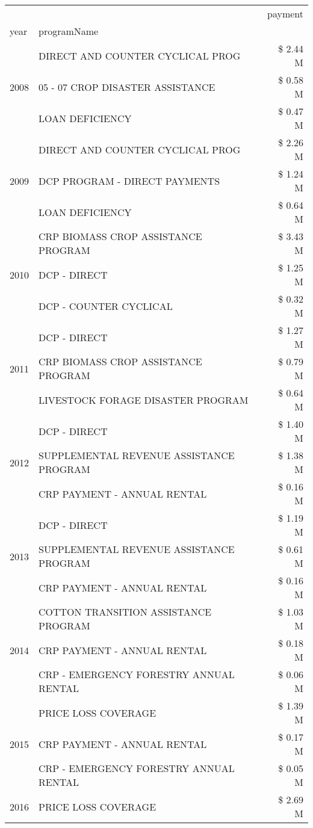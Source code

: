 \begin{tabular}{llr}
\toprule
 &  & payment \\
year & programName &  \\
\midrule
\multirow[t]{3}{*}{2008} & DIRECT AND COUNTER CYCLICAL PROG & \$ 2.44 M \\
 & 05 - 07 CROP DISASTER ASSISTANCE & \$ 0.58 M \\
 & LOAN DEFICIENCY & \$ 0.47 M \\
\cline{1-3}
\multirow[t]{3}{*}{2009} & DIRECT AND COUNTER CYCLICAL PROG & \$ 2.26 M \\
 & DCP PROGRAM - DIRECT PAYMENTS & \$ 1.24 M \\
 & LOAN DEFICIENCY & \$ 0.64 M \\
\cline{1-3}
\multirow[t]{3}{*}{2010} & CRP BIOMASS CROP ASSISTANCE PROGRAM & \$ 3.43 M \\
 & DCP - DIRECT & \$ 1.25 M \\
 & DCP - COUNTER CYCLICAL & \$ 0.32 M \\
\cline{1-3}
\multirow[t]{3}{*}{2011} & DCP - DIRECT & \$ 1.27 M \\
 & CRP BIOMASS CROP ASSISTANCE PROGRAM & \$ 0.79 M \\
 & LIVESTOCK FORAGE DISASTER PROGRAM & \$ 0.64 M \\
\cline{1-3}
\multirow[t]{3}{*}{2012} & DCP - DIRECT & \$ 1.40 M \\
 & SUPPLEMENTAL REVENUE ASSISTANCE PROGRAM & \$ 1.38 M \\
 & CRP PAYMENT - ANNUAL RENTAL & \$ 0.16 M \\
\cline{1-3}
\multirow[t]{3}{*}{2013} & DCP - DIRECT & \$ 1.19 M \\
 & SUPPLEMENTAL REVENUE ASSISTANCE PROGRAM & \$ 0.61 M \\
 & CRP PAYMENT - ANNUAL RENTAL & \$ 0.16 M \\
\cline{1-3}
\multirow[t]{3}{*}{2014} & COTTON TRANSITION ASSISTANCE PROGRAM & \$ 1.03 M \\
 & CRP PAYMENT - ANNUAL RENTAL & \$ 0.18 M \\
 & CRP - EMERGENCY FORESTRY ANNUAL RENTAL & \$ 0.06 M \\
\cline{1-3}
\multirow[t]{3}{*}{2015} & PRICE LOSS COVERAGE & \$ 1.39 M \\
 & CRP PAYMENT - ANNUAL RENTAL & \$ 0.17 M \\
 & CRP - EMERGENCY FORESTRY ANNUAL RENTAL & \$ 0.05 M \\
\cline{1-3}
\multirow[t]{3}{*}{2016} & PRICE LOSS COVERAGE & \$ 2.69 M \\

\end{tabular}

